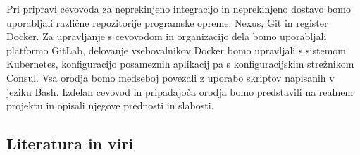 \documentclass[a4paper, 12pt]{article}
\newcommand\cmnt[1]{\textcolor{munsell}{#1}}
\begin{document}
Pri pripravi cevovoda za neprekinjeno integracijo in neprekinjeno dostavo bomo uporabljali različne repozitorije programske opreme: Nexus, Git in register Docker. Za upravljanje s cevovodom in organizacijo dela bomo uporabljali platformo GitLab, delovanje vsebovalnikov Docker bomo upravljali s sistemom Kubernetes, konfiguracijo posameznih aplikacij pa s konfiguracijskim strežnikom Consul. Vsa orodja bomo medseboj povezali z uporabo skriptov napisanih v jeziku Bash. Izdelan cevovod in pripadajoča orodja bomo predstavili na realnem projektu in opisali njegove prednosti in slabosti.

\subsection{Literatura in viri}
\label{literatura}


\renewcommand\refname{}
\vspace{-50px}




%
\end{document}
